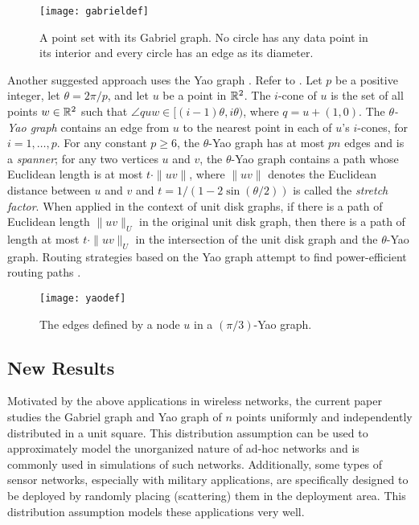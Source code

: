 \documentclass[lotsofwhite,charterfonts]{patmorin}
\begin{document}
\begin{figure}
\begin{center}{\texttt{[image: gabrieldef]}}\end{center}
\caption{A point set with its Gabriel graph. No circle has
any data point in its interior and every circle has an edge
as its diameter.}
\end{figure}

Another suggested approach uses the Yao graph \cite{y82}. Refer to
. Let $p$ be a positive integer, let $\theta=2\pi/p$,
and let $u$ be a point in $\mathbb{R}^2$.  The $i$-cone of $u$ is the set of all
points $w\in\mathbb{R}^2$ such that $\angle quw \in [(i-1)\theta,i\theta)$, where
$q = u+(1,0)$.  The \emph{$\theta$-Yao graph} contains an edge from $u$
to the nearest point in each of $u$'s $i$-cones, for $i=1,\ldots,p$.
For any constant $p\ge 6$, the $\theta$-Yao graph has at most $pn$
edges and is a \emph{spanner}; for any two vertices $u$ and $v$, the
$\theta$-Yao graph contains a path whose Euclidean length is at most
$t\cdot\|uv\|$, where $\|uv\|$ denotes the Euclidean distance between $u$
and $v$ and $t=1/(1-2\sin(\theta/2))$ is called the \emph{stretch factor}.
When applied in the context of unit disk graphs, if there is a path of
Euclidean length $\|uv\|_U$ in the original unit disk graph, then there
is a path of length at most $t\cdot\|uv\|_U$ in the intersection of
the unit disk graph and the $\theta$-Yao graph.  Routing strategies
based on the Yao graph attempt to find power-efficient routing paths
\cite{glsv02,lwy01,wlbw01,svz07}.

\begin{figure}
\begin{center}{\texttt{[image: yaodef]}}\end{center}
\caption{The edges defined by a node $u$ in a $(\pi/3)$-Yao graph.}
\end{figure}


\subsection{New Results}

Motivated by the above applications in wireless networks, the current
paper studies the Gabriel graph and Yao graph of $n$ points uniformly
and independently distributed in a unit square.  This distribution
assumption can be used to approximately model the unorganized nature of
ad-hoc networks and is commonly used in simulations of such networks.
Additionally, some types of sensor networks, especially with military
applications, are specifically designed to be deployed by randomly placing
(scattering) them in the deployment area. This distribution assumption
models these applications very well.
\end{document}
